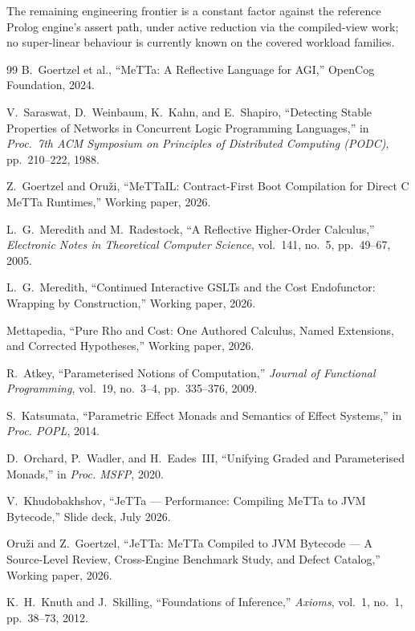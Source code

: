 \documentclass[11pt]{article}
\begin{document}
The remaining engineering frontier is a constant factor against the
reference Prolog engine's assert path, under active reduction via the
compiled-view work; no super-linear behaviour is currently known on the
covered workload families.


\begin{thebibliography}{99}
  B.~Goertzel et al.,
  ``MeTTa: A Reflective Language for AGI,''
  OpenCog Foundation, 2024.

  V.~Saraswat, D.~Weinbaum, K.~Kahn, and E.~Shapiro,
  ``Detecting Stable Properties of Networks in Concurrent Logic
  Programming Languages,''
  in \emph{Proc.\ 7th ACM Symposium on Principles of Distributed
  Computing (PODC)}, pp.~210--222, 1988.

  Z.~Goertzel and Oru\v{z}i,
  ``MeTTaIL: Contract-First Boot Compilation for Direct C MeTTa Runtimes,''
  Working paper, 2026.

  L.~G.~Meredith and M.~Radestock,
  ``A Reflective Higher-Order Calculus,''
  \emph{Electronic Notes in Theoretical Computer Science}, vol.~141, no.~5,
  pp.~49--67, 2005.

  L.~G.~Meredith,
  ``Continued Interactive GSLTs and the Cost Endofunctor: Wrapping by
  Construction,'' Working paper, 2026.

  Mettapedia,
  ``Pure Rho and Cost: One Authored Calculus, Named Extensions, and Corrected
  Hypotheses,'' Working paper, 2026.

  R.~Atkey,
  ``Parameterised Notions of Computation,''
  \emph{Journal of Functional Programming}, vol.~19, no.~3--4,
  pp.~335--376, 2009.

  S.~Katsumata,
  ``Parametric Effect Monads and Semantics of Effect Systems,''
  in \emph{Proc. POPL}, 2014.

  D.~Orchard, P.~Wadler, and H.~Eades~III,
  ``Unifying Graded and Parameterised Monads,''
  in \emph{Proc. MSFP}, 2020.

  V.~Khudobakhshov,
  ``JeTTa --- Performance: Compiling MeTTa to JVM Bytecode,''
  Slide deck, July 2026.

  Oru\v{z}i and Z.~Goertzel,
  ``JeTTa: MeTTa Compiled to JVM Bytecode --- A Source-Level Review,
  Cross-Engine Benchmark Study, and Defect Catalog,''
  Working paper, 2026.

  K.~H.~Knuth and J.~Skilling,
  ``Foundations of Inference,''
  \emph{Axioms}, vol.~1, no.~1, pp.~38--73, 2012.


\end{thebibliography}
\end{document}
